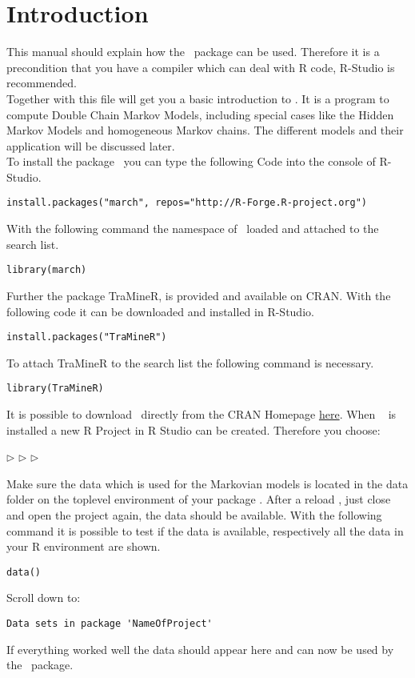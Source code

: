 \section{Introduction}
This manual should explain how the \M ~package can be used. Therefore it is a precondition that you have a compiler which can deal with R code, R-Studio is  recommended.\\
Together with \manual this file will get you a basic introduction to \M. It is a program to compute Double Chain Markov Models, including special cases like the Hidden Markov Models and homogeneous Markov chains. The different models and their application will be discussed later. \\
To install the package \M ~you can type the following Code into the console of R-Studio.
\begin{verbatim}
install.packages("march", repos="http://R-Forge.R-project.org")
\end{verbatim}
With the following command the namespace of \M ~loaded and attached to the search list. 
\begin{verbatim}
library(march)
\end{verbatim}
Further the package TraMineR, is provided and available on CRAN. With the following code it can be downloaded and installed in R-Studio.
\begin{verbatim}
install.packages("TraMineR")
\end{verbatim}
To attach TraMineR to the search list the following command is necessary. 
\begin{verbatim}
library(TraMineR)
\end{verbatim}
It is possible to download \M ~directly from the CRAN Homepage  \href{https://cran.r-project.org/web/packages/march/index.html}{here}. When \M~ is installed a new R Project in R Studio can be created. Therefore you choose:\\
\begin{center}
\hspace{6pt} $\triangleright$\hspace{6pt}\hspace{6pt} $\triangleright $\hspace{6pt} \hspace{6pt} $\triangleright$\hspace{6pt}
\end{center}
Make sure the data which is used for the Markovian models is located in the data folder on the toplevel environment of your package \M. After a reload \M, just close and open the project again, the data should be available. With the following command it is possible to test if the data is available, respectively all the data in your R environment are shown. 
\begin{verbatim}
data()
\end{verbatim}
Scroll down to:
\begin{verbatim}Data sets in package 'NameOfProject'\end{verbatim}
If everything worked well the data should appear here and can now be used by the \M ~package. 